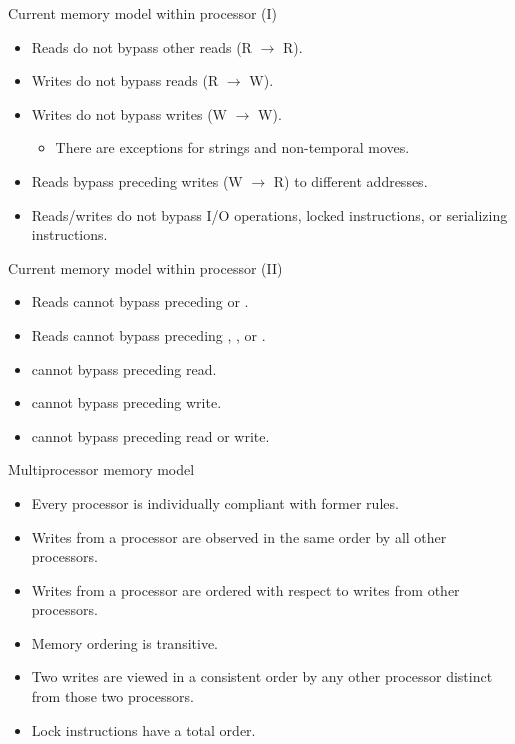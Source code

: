 \begin{frame}[t]{Current memory model within processor (I)}
\begin{itemize}
  \item Reads do not bypass other reads (R $\rightarrow$ R).
  \item Writes do not bypass reads (R $\rightarrow$ W).
  \item Writes do not bypass writes (W $\rightarrow$ W).
    \begin{itemize}
      \item There are exceptions for strings and non-temporal moves.
    \end{itemize}
  \item Reads bypass preceding writes (W $\rightarrow$ R) to different addresses.
  \item Reads/writes do not bypass I/O operations, locked instructions, or
        serializing instructions.
\end{itemize}
\end{frame}

\begin{frame}[t]{Current memory model within processor (II)}
\begin{itemize}
  \item Reads cannot bypass preceding  or .
  \item Reads cannot bypass preceding , , or .
  \item {} cannot bypass preceding read.
  \item {} cannot bypass preceding write.
  \item {} cannot bypass preceding read or write.
\end{itemize}
\end{frame}

\begin{frame}[t]{Multiprocessor memory model}
\begin{itemize}
  \item Every processor is individually compliant with former rules.
  \item Writes from a processor are observed in the same order by all other processors.
  \item Writes from a processor are  ordered
        with respect to writes from other processors.
  \item Memory ordering is transitive.
  \item Two writes are viewed in a consistent order by any other processor
        distinct from those two processors.
  \item Lock instructions have a total order.
\end{itemize}
\end{frame}
